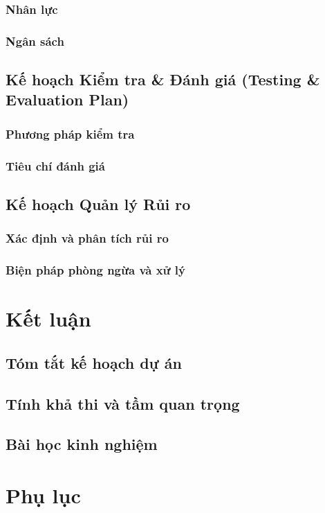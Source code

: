 \documentclass[a4paper,12pt]{article}
\begin{document}
\subsubsection{Nhân lực}
\subsubsection{Ngân sách}

\subsection{Kế hoạch Kiểm tra \& Đánh giá (Testing \& Evaluation Plan)}
\subsubsection{Phương pháp kiểm tra}
\subsubsection{Tiêu chí đánh giá}

\subsection{Kế hoạch Quản lý Rủi ro}
\subsubsection{Xác định và phân tích rủi ro}
\subsubsection{Biện pháp phòng ngừa và xử lý}

\section{Kết luận}
\subsection{Tóm tắt kế hoạch dự án}
\subsection{Tính khả thi và tầm quan trọng}
\subsection{Bài học kinh nghiệm}

\section{Phụ lục}
\end{document}
